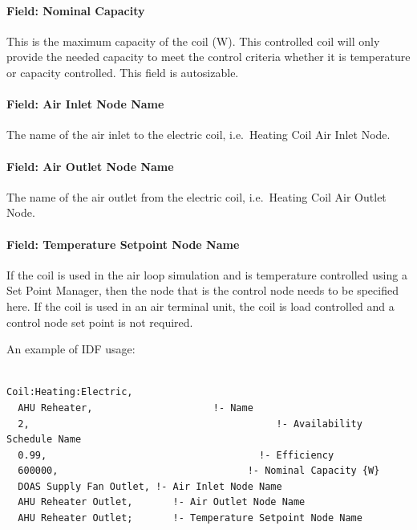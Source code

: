 \paragraph{Field: Nominal Capacity}\label{field-nominal-capacity-000}

This is the maximum capacity of the coil (W). This controlled coil will only provide the needed capacity to meet the control criteria whether it is temperature or capacity controlled. This field is autosizable.

\paragraph{Field: Air Inlet Node Name}\label{field-air-inlet-node-name-3-001}

The name of the air inlet to the electric coil, i.e.~Heating Coil Air Inlet Node.

\paragraph{Field: Air Outlet Node Name}\label{field-air-outlet-node-name-3-001}

The name of the air outlet from the electric coil, i.e.~Heating Coil Air Outlet Node.

\paragraph{Field: Temperature Setpoint Node Name}\label{field-temperature-setpoint-node-name-1}

If the coil is used in the air loop simulation and is temperature controlled using a Set Point Manager, then the node that is the control node needs to be specified here. If the coil is used in an air terminal unit, the coil is load controlled and a control node set point is not required.

An example of IDF usage:

\begin{lstlisting}

Coil:Heating:Electric,
  AHU Reheater,                     !- Name
  2,                                           !- Availability Schedule Name
  0.99,                                     !- Efficiency
  600000,                                 !- Nominal Capacity {W}
  DOAS Supply Fan Outlet, !- Air Inlet Node Name
  AHU Reheater Outlet,       !- Air Outlet Node Name
  AHU Reheater Outlet;       !- Temperature Setpoint Node Name
\end{lstlisting}

